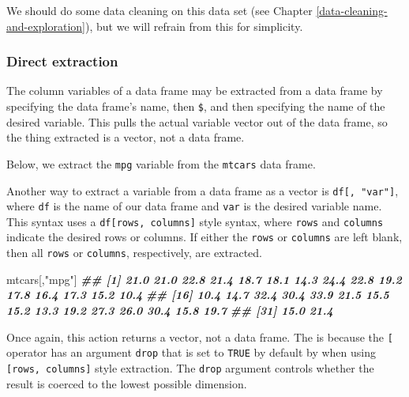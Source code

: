 \documentclass[
]{book}
\newenvironment{Shaded}{\begin{snugshade}}{\end{snugshade}}
\newcommand{\DocumentationTok}[1]{\textcolor[rgb]{0.56,0.35,0.01}{\textbf{\textit{#1}}}}
\newcommand{\NormalTok}[1]{#1}
\newcommand{\SpecialCharTok}[1]{\textcolor[rgb]{0.00,0.00,0.00}{#1}}
\newcommand{\StringTok}[1]{\textcolor[rgb]{0.31,0.60,0.02}{#1}}
\theoremstyle{definition}
\theoremstyle{definition}
\theoremstyle{definition}
\theoremstyle{definition}
\theoremstyle{remark}
\begin{document}
We should do some data cleaning on this data set (see Chapter \ref{data-cleaning-and-exploration}), but we will refrain from this for simplicity.

\hypertarget{direct-extraction}{%
\subsubsection{Direct extraction}\label{direct-extraction}}

The column variables of a data frame may be extracted from a data frame by specifying the data frame's name, then \texttt{\$}, and then specifying the name of the desired variable. This pulls the actual variable vector out of the data frame, so the thing extracted is a vector, not a data frame.

Below, we extract the \texttt{mpg} variable from the \texttt{mtcars} data frame.

\begin{Shaded}
\end{Shaded}

Another way to extract a variable from a data frame as a vector is \texttt{df{[},\ "var"{]}}, where \texttt{df} is the name of our data frame and \texttt{var} is the desired variable name. This syntax uses a \texttt{df{[}rows,\ columns{]}} style syntax, where \texttt{rows} and \texttt{columns} indicate the desired rows or columns. If either the \texttt{rows} or \texttt{columns} are left blank, then all \texttt{rows} or \texttt{columns}, respectively, are extracted.

\begin{Shaded}
\begin{Highlighting}[]
\NormalTok{mtcars[,}\StringTok{"mpg"}\NormalTok{]}
\DocumentationTok{\#\#  [1] 21.0 21.0 22.8 21.4 18.7 18.1 14.3 24.4 22.8 19.2 17.8 16.4 17.3 15.2 10.4}
\DocumentationTok{\#\# [16] 10.4 14.7 32.4 30.4 33.9 21.5 15.5 15.2 13.3 19.2 27.3 26.0 30.4 15.8 19.7}
\DocumentationTok{\#\# [31] 15.0 21.4}
\end{Highlighting}
\end{Shaded}

Once again, this action returns a vector, not a data frame. The is because the \texttt{{[}} operator has an argument \texttt{drop} that is set to \texttt{TRUE} by default by when using \texttt{{[}rows,\ columns{]}} style extraction. The \texttt{drop} argument controls whether the result is coerced to the lowest possible dimension.
\end{document}
